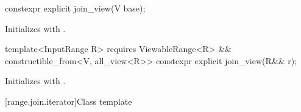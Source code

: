 %
\begin{itemdecl}
constexpr explicit join_view(V base);
\end{itemdecl}

\begin{itemdescr}
\pnum
\effects Initializes  with .
\end{itemdescr}

%
\begin{itemdecl}
template<InputRange R>
  requires ViewableRange<R> && constructible_from<V, all_view<R>>
constexpr explicit join_view(R&& r);
\end{itemdecl}

\begin{itemdescr}
\pnum
\effects Initializes  with .
\end{itemdescr}

[range.join.iterator]{Class template }


